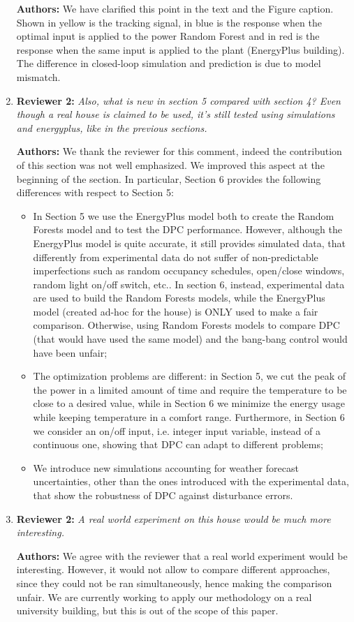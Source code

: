 \documentclass{article}
\begin{document}
\begin{enumerate}
\textbf{Authors:} We have clarified this point in the text and the Figure caption. Shown in yellow is the tracking signal, in blue is the response when the optimal input is applied to the power Random Forest and in red is the response when the same input is applied to the plant (EnergyPlus building). The difference in closed-loop simulation and prediction is due to model mismatch.

\item \textbf{Reviewer 2:} \textit{Also, what is new in section 5 compared with section 4? Even though a real house is claimed to be used, it's still tested using simulations and energyplus, like in the previous sections.}

\textbf{Authors:} We thank the reviewer for this comment, indeed the contribution of this section was not well emphasized. We improved this aspect at the beginning of the section. In particular, Section 6 provides the following differences with respect to Section 5:
\begin{itemize}
	\item In Section 5 we use the EnergyPlus model both to create the Random Forests model and to test the DPC performance.
	However, although the EnergyPlus model is quite accurate, it still provides simulated data, that differently from experimental data do not suffer of non-predictable imperfections such as random occupancy schedules, open/close windows, random light on/off switch, etc.. In section 6, instead, experimental data are used to build the Random Forests models, while the EnergyPlus model (created ad-hoc for the house) is ONLY used to make a fair comparison. Otherwise, using Random Forests models to compare DPC (that would have used the same model) and the bang-bang control would have been unfair;
	\item The optimization problems are different: in Section 5, we cut the peak of the power in a limited amount of time and require the temperature to be close to a desired value, while in Section 6 we minimize the energy usage while keeping temperature in a comfort range. Furthermore, in Section 6 we consider an on/off input, i.e. integer input variable, instead of a continuous one, showing that DPC can adapt to different problems;
	\item We introduce new simulations accounting for weather forecast uncertainties, other than the ones introduced with the experimental data, that show the robustness of DPC against disturbance errors.
\end{itemize}

\item \textbf{Reviewer 2:} \textit{A real world experiment on this house would be much more interesting.}

\textbf{Authors:} We agree with the reviewer that a real world experiment would be interesting.
However, it would not allow to compare different approaches, since they could not be ran simultaneously, hence making the comparison unfair.
We are currently working to apply our methodology on a real university building, but this is out of the scope of this paper.


\end{enumerate}
\end{document}
